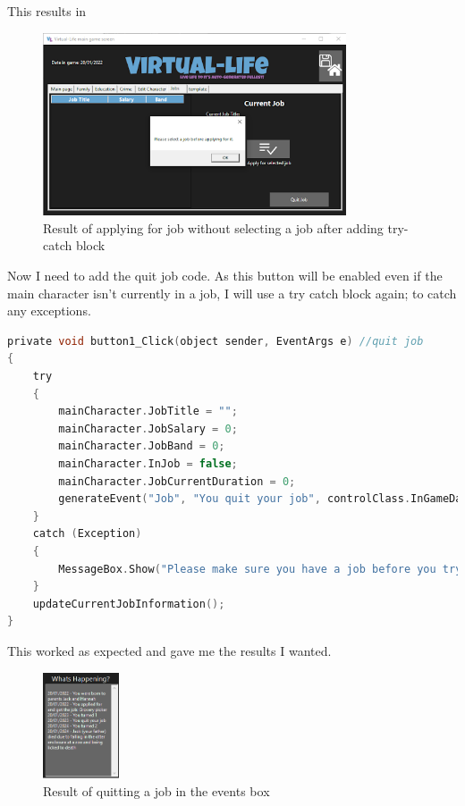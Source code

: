This results in
\begin{figure}[H]
    \centering
    \includegraphics[width=0.8\textwidth]{images/implementation/jobs7.png}
    \caption{Result of applying for job without selecting a job after adding try-catch block}
    \label{fig:implementation-jobs7}
\end{figure}
\noindent Now I need to add the quit job code. As this button will be enabled even if the main character isn't currently in a job, I will use a try catch block again; to catch any exceptions.
\begin{lstlisting}[language=c, style=csharp, caption=Quit job algorithm]
private void button1_Click(object sender, EventArgs e) //quit job
{
    try
    {
        mainCharacter.JobTitle = "";
        mainCharacter.JobSalary = 0;
        mainCharacter.JobBand = 0;
        mainCharacter.InJob = false;
        mainCharacter.JobCurrentDuration = 0;
        generateEvent("Job", "You quit your job", controlClass.InGameDate);
    }
    catch (Exception)
    {
        MessageBox.Show("Please make sure you have a job before you try to quit it.");
    }
    updateCurrentJobInformation();
}
\end{lstlisting}
This worked as expected and gave me the results I wanted.
\begin{figure}[H]
    \centering
    \includegraphics[width=0.2\textwidth]{images/implementation/jobs8.png}
    \caption{Result of quitting a job in the events box}
    \label{fig:implementation-jobs8}
\end{figure}
